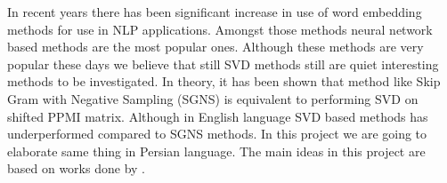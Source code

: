 %
In recent years there has been significant increase in use of word embedding methods for use in NLP applications. Amongst those methods neural network based methods are the most popular ones. Although these methods are very popular these days we believe that still SVD methods still are quiet interesting methods to be investigated.  In theory, it has been shown that method like Skip Gram with Negative Sampling (SGNS) is equivalent to performing SVD on shifted PPMI matrix. Although in English language SVD based methods has underperformed compared to SGNS methods. In this project we are going to elaborate same thing in Persian language. The main ideas in this project are based on works done by \cite{DBLP:conf/conll/2014} \cite{DBLP:journals/tacl/LevyGD15} \cite{NIPS2014_5477}. 

